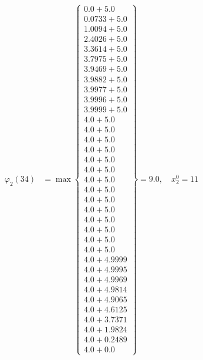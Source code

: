 \documentclass{article}
\begin{document}
\begin{align*}
\varphi_{2}(34) &= \max \left\{ \begin{array}{c}
0.0 + 5.0 \\
 0.0733 + 5.0 \\
 1.0094 + 5.0 \\
 2.4026 + 5.0 \\
 3.3614 + 5.0 \\
 3.7975 + 5.0 \\
 3.9469 + 5.0 \\
 3.9882 + 5.0 \\
 3.9977 + 5.0 \\
 3.9996 + 5.0 \\
 3.9999 + 5.0 \\
 4.0 + 5.0 \\
 4.0 + 5.0 \\
 4.0 + 5.0 \\
 4.0 + 5.0 \\
 4.0 + 5.0 \\
 4.0 + 5.0 \\
 4.0 + 5.0 \\
 4.0 + 5.0 \\
 4.0 + 5.0 \\
 4.0 + 5.0 \\
 4.0 + 5.0 \\
 4.0 + 5.0 \\
 4.0 + 5.0 \\
 4.0 + 5.0 \\
 4.0 + 4.9999 \\
 4.0 + 4.9995 \\
 4.0 + 4.9969 \\
 4.0 + 4.9814 \\
 4.0 + 4.9065 \\
 4.0 + 4.6125 \\
 4.0 + 3.7371 \\
 4.0 + 1.9824 \\
 4.0 + 0.2489 \\
 4.0 + 0.0
\end{array} \right\}=9.0, \quad x_{2}^0=11\\
  

\end{align*}
\end{document}
